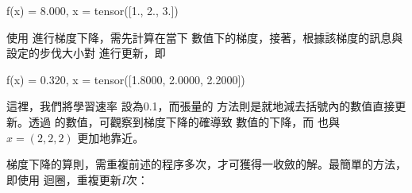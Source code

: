 \documentclass[letterpaper,10pt,english]{sphinxmanual}
\begin{document}
\begin{sphinxVerbatim}[commandchars=\\\{\}]
f(x) = 8.000, x = tensor([1., 2., 3.])
\end{sphinxVerbatim}

使用  進行梯度下降，需先計算在當下  數值下的梯度，接著，根據該梯度的訊息與設定的步伐大小對  進行更新，即

\begin{sphinxVerbatim}[commandchars=\\\{\}]
  
 
      
  
 
\end{sphinxVerbatim}

\begin{sphinxVerbatim}[commandchars=\\\{\}]
f(x) = 0.320, x = tensor([1.8000, 2.0000, 2.2000])
\end{sphinxVerbatim}

這裡，我們將學習速率  設為0.1，而張量的  方法則是就地減去括號內的數值直接更新。透過  的數值，可觀察到梯度下降的確導致  數值的下降，而  也與 \(\widehat{x}=(2,2,2)\) 更加地靠近。

梯度下降的算則，需重複前述的程序多次，才可獲得一收斂的解。最簡單的方法，即使用  迴圈，重複更新\(I\)次：
\end{document}
